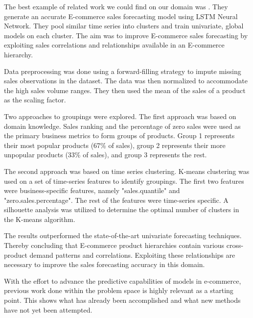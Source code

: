 %
%

The best example of related work we could find on our domain was
\cite{Bandara2019}.
They generate an accurate E-commerce sales forecasting model using LSTM  Neural Network.
They pool similar time series into clusters and train univariate, global models on each cluster.
The aim was to improve E-commerce sales forecasting by exploiting sales correlations and relationships
available in an E-commerce hierarchy.

Data preprocessing was done using a forward-filling strategy to impute missing sales
observations in the dataset.
The data was then normalized to accommodate the high sales volume ranges.
They then used the mean of the sales of a product as the scaling factor.

Two approaches to groupings were explored.
The first approach was based on domain knowledge.
Sales ranking and the percentage of zero sales were used as the primary business metrics
to form groups of products.
Group 1 represents their most popular products (67\% of sales), group 2 represents
their more unpopular products (33\% of sales), and group 3 represents the rest.

The second approach was based on time series clustering.
K-means clustering was used on a set of time-series features to identify groupings.
The first two features were business-specific features, namely "sales.quantile" and "zero.sales.percentage".
The rest of the features were time-series specific.
A silhouette analysis was utilized to determine the optimal number of clusters in the K-means algorithm.

The results outperformed the state-of-the-art univariate forecasting techniques.
Thereby concluding that E-commerce product hierarchies contain various cross-product demand
patterns and correlations.
Exploiting these relationships are necessary to improve the sales forecasting
accuracy in this domain.

With the effort to advance the predictive capabilities of models in e-commerce,
previous work done within the problem space is highly relevant as a starting point.
This shows what has already been accomplished and what new methods have not yet been attempted.


